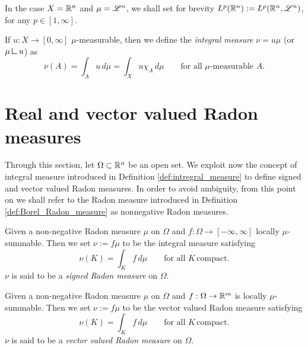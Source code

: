 In the case $X = \mathbb{R}^{n}$ and $\mu = \mathscr{L}^{n}$, we shall set for brevity $L^{p}(\mathbb{R}^{n}) := L^{p}(\mathbb{R}^{n}, \mathscr{L}^{n})$, for any $p \in [1, \infty]$.

\begin{definition} \label{def:intregral_measure}
If $u : X \to [0,\infty]$ $\mu$-measurable, then we define the {\em integral measure} $\nu = u \mu$ (or
$\mu \res u$) as 
\[
\nu(A) = \int_A u \, d\mu = \int_X u \chi_A \, d\mu 
\qquad \text{for all } \mu\text{-measurable } A.
\]
\end{definition}

\section{Real and vector valued Radon measures}

Through this section, let $\Omega \subset \mathbb{R}^{n}$ be an open set. We exploit now the concept of integral measure introduced in Definition \ref{def:intregral_measure} to define signed and vector valued Radon measures. In order to avoid ambiguity, from this point on we shall refer to the Radon measure introduced in Definition \ref{def:Borel_Radon_measure} as nonnegative Radon measures.

\begin{definition}
Given a non-negative Radon measure $\mu$ on $\Omega$ and $f: \Omega \to
[-\infty,\infty]$ locally $\mu$-summable. Then we set $\nu := f \mu$ to be the integral measure satisfying
\[
\nu(K) = \int_K f \, d\mu 
\qquad \text{for all }  K \, \text{compact.}
\]
$\nu$ is said to be a \emph{signed Radon measure} on $\Omega$.
\end{definition}

\begin{definition}
Given a non-negative Radon measure $\mu$ on $\Omega$ and $f: \Omega \to
\mathbb{R}^m$ is locally $\mu$-summable. Then we set $\nu := f \mu$ to be the vector valued Radon measure satisfying
\[
\nu(K) = \int_K f \, d\mu 
\qquad \text{for all }  K \, \text{compact.}
\]
$\nu$ is said to be a \emph{vector valued Radon measure} on $\Omega$.
\end{definition}



